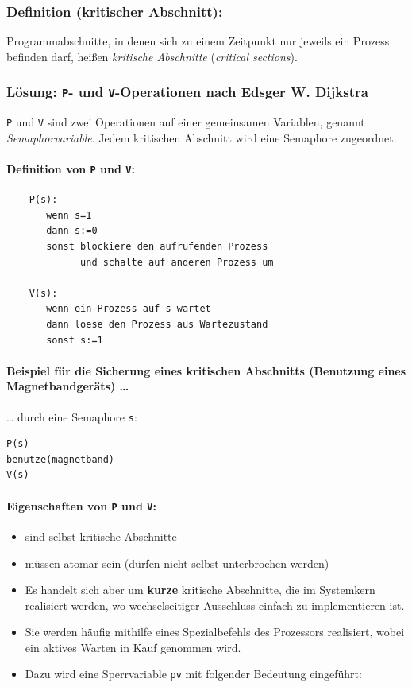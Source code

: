 \documentclass[11pt]{article}
\begin{document}
\subsubsection*{Definition (kritischer Abschnitt):}
\label{sec:org8009881}
Programmabschnitte, in denen sich zu einem Zeitpunkt nur jeweils ein
Prozess befinden darf, heißen \emph{kritische Abschnitte} (\emph{critical
sections}).

\subsubsection*{Lösung: \texttt{P}- und \texttt{V}-Operationen nach Edsger W. Dijkstra}
\label{sec:orga28f678}
\texttt{P} und \texttt{V} sind zwei Operationen auf einer gemeinsamen Variablen,
genannt \emph{Semaphorvariable}. Jedem kritischen Abschnitt wird eine
Semaphore zugeordnet.

\paragraph*{Definition von \texttt{P} und \texttt{V}:}
\label{sec:org4eeac52}
\begin{verbatim}
    P(s):
       wenn s=1
       dann s:=0
       sonst blockiere den aufrufenden Prozess
             und schalte auf anderen Prozess um
        
    V(s):
       wenn ein Prozess auf s wartet
       dann loese den Prozess aus Wartezustand
       sonst s:=1
\end{verbatim}

\paragraph*{Beispiel für die Sicherung eines kritischen Abschnitts (Benutzung eines Magnetbandgeräts) \ldots{}}
\label{sec:org93e336b}
\ldots{} durch eine Semaphore \texttt{s}:

\begin{verbatim}
P(s)
benutze(magnetband)
V(s)
\end{verbatim}

\paragraph*{Eigenschaften von \texttt{P} und \texttt{V}:}
\label{sec:org67efb8d}
\begin{itemize}
\item sind selbst kritische Abschnitte
\item müssen atomar sein (dürfen nicht selbst unterbrochen werden)
\item Es handelt sich aber um \textbf{kurze} kritische Abschnitte, die im
Systemkern realisiert werden, wo wechselseitiger Ausschluss einfach zu implementieren ist.
\item Sie werden häufig mithilfe eines Spezialbefehls des Prozessors
realisiert, wobei ein aktives Warten in Kauf genommen wird.
\item Dazu wird eine Sperrvariable \texttt{pv} mit folgender Bedeutung eingeführt:
\end{itemize}
\end{document}
